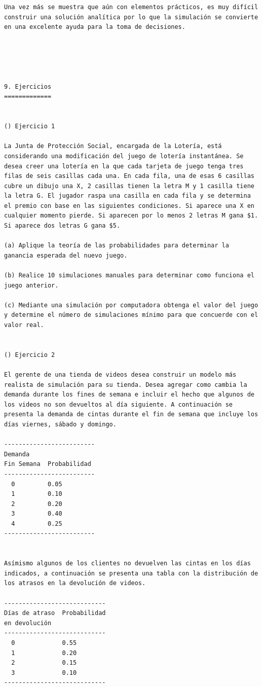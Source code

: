 \begin{verbatim}
Una vez más se muestra que aún con elementos prácticos, es muy difícil construir una solución analítica por lo que la simulación se convierte en una excelente ayuda para la toma de decisiones.



 

9. Ejercicios
=============


() Ejercicio 1

La Junta de Protección Social, encargada de la Lotería, está considerando una modificación del juego de lotería instantánea. Se desea creer una lotería en la que cada tarjeta de juego tenga tres filas de seis casillas cada una. En cada fila, una de esas 6 casillas cubre un dibujo una X, 2 casillas tienen la letra M y 1 casilla tiene la letra G. El jugador raspa una casilla en cada fila y se determina el premio con base en las siguientes condiciones. Si aparece una X en cualquier momento pierde. Si aparecen por lo menos 2 letras M gana $1. Si aparece dos letras G gana $5.

(a) Aplique la teoría de las probabilidades para determinar la ganancia esperada del nuevo juego.

(b) Realice 10 simulaciones manuales para determinar como funciona el juego anterior.

(c) Mediante una simulación por computadora obtenga el valor del juego y determine el número de simulaciones mínimo para que concuerde con el valor real.


() Ejercicio 2

El gerente de una tienda de videos desea construir un modelo más realista de simulación para su tienda. Desea agregar como cambia la demanda durante los fines de semana e incluir el hecho que algunos de los videos no son devueltos al día siguiente. A continuación se presenta la demanda de cintas durante el fin de semana que incluye los días viernes, sábado y domingo. 

-------------------------
Demanda
Fin Semana  Probabilidad
-------------------------
  0         0.05
  1         0.10
  2         0.20
  3         0.40
  4         0.25
-------------------------


Asímismo algunos de los clientes no devuelven las cintas en los días indicados, a continuación se presenta una tabla con la distribución de los atrasos en la devolución de videos.

----------------------------
Días de atraso  Probabilidad
en devolución
----------------------------
  0             0.55
  1             0.20
  2             0.15
  3             0.10
----------------------------



\end{verbatim}

